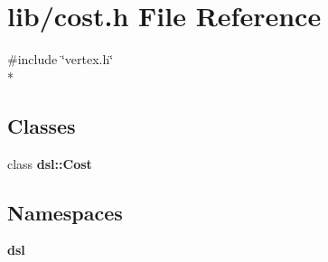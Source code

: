 \section{lib/cost.h File Reference}
\label{lib_2cost_8h}
{\ttfamily \#include \char`\"{}vertex.\-h\char`\"{}}\\*
\subsection*{Classes}
\begin{DoxyCompactItemize}
\item 
class {\bf dsl\-::\-Cost}
\end{DoxyCompactItemize}
\subsection*{Namespaces}
\begin{DoxyCompactItemize}
\item 
{\bf dsl}
\end{DoxyCompactItemize}
